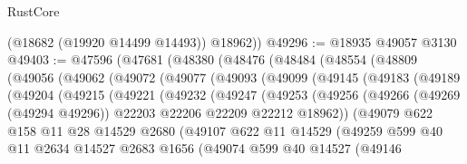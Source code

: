 \begin{lexlean}{RustCore}
\begin{coremodule}
        (@18682 (@19920 @14499 @14493))
        @18962))
@49296 := @18935 @49057 @3130
@49403 := @47596
    (@47681
      (@48380
        (@48476
          (@48484
            (@48554
              (@48809
                (@49056
                  (@49062
                    (@49072
                      (@49077
                        (@49093
                          (@49099
                            (@49145
                              (@49183
                                (@49189
                                  (@49204
                                    (@49215
                                      (@49221
                                        (@49232
                                          (@49247
                                            (@49253
                                              (@49256
                                                (@49266
                                                  (@49269 (@49294 @49296))
                                                  @22203
                                                  @22206
                                                  @22209
                                                  @22212
                                                  @18962))
                                              (@49079
                                                @622
                                                @158
                                                @11
                                                @28
                                                @14529
                                                @2680
                                                (@49107
                                                  @622
                                                  @11
                                                  @14529
                                                  (@49259
                                                    @599
                                                    @40
                                                    @11
                                                    @2634
                                                    @14527
                                                    @2683
                                                    @1656
                                                    (@49074
                                                      @599
                                                      @40
                                                      @14527
                                                      (@49146

\end{coremodule}
\end{lexlean}

